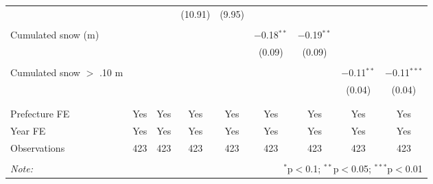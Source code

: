 \begin{tabular}{@{\extracolsep{5pt}}lcccccccc}
  &  &  & (10.91) & (9.95) &  &  &  &  \\ 
  & & & & & & & & \\ 
 Cumulated snow (m) &  &  &  &  & $-$0.18$^{**}$ & $-$0.19$^{**}$ &  &  \\ 
  &  &  &  &  & (0.09) & (0.09) &  &  \\ 
  & & & & & & & & \\ 
 Cumulated snow $>$ .10 m &  &  &  &  &  &  & $-$0.11$^{**}$ & $-$0.11$^{***}$ \\ 
  &  &  &  &  &  &  & (0.04) & (0.04) \\ 
  & & & & & & & & \\ 
\hline \\[-1.8ex] 
Prefecture FE & Yes & Yes & Yes & Yes & Yes & Yes & Yes & Yes \\ 
Year FE & Yes & Yes & Yes & Yes & Yes & Yes & Yes & Yes \\ 
Observations & 423 & 423 & 423 & 423 & 423 & 423 & 423 & 423 \\ 
\hline 
\hline \\[-1.8ex] 
\textit{Note:}  & \multicolumn{8}{r}{$^{*}$p$<$0.1; $^{**}$p$<$0.05; $^{***}$p$<$0.01} \\ 
\end{tabular} 
